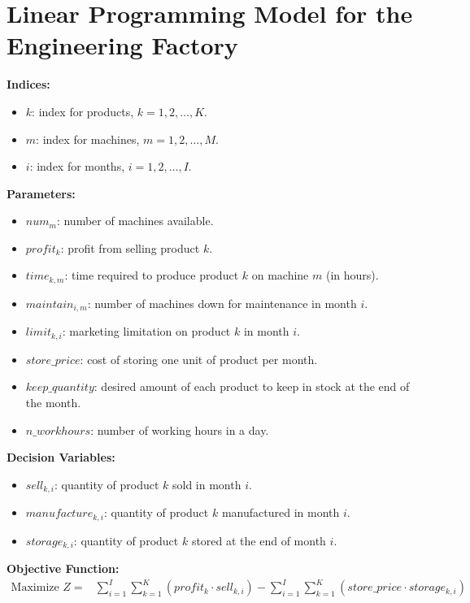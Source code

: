 \documentclass{article}
\begin{document}
\section*{Linear Programming Model for the Engineering Factory}

\textbf{Indices:}
\begin{itemize}
    \item $k$: index for products, $k = 1, 2, \ldots, K$.
    \item $m$: index for machines, $m = 1, 2, \ldots, M$.
    \item $i$: index for months, $i = 1, 2, \ldots, I$.
\end{itemize}

\textbf{Parameters:}
\begin{itemize}
    \item $num_m$: number of machines available.
    \item $profit_k$: profit from selling product $k$.
    \item $time_{k, m}$: time required to produce product $k$ on machine $m$ (in hours).
    \item $maintain_{i, m}$: number of machines down for maintenance in month $i$.
    \item $limit_{k, i}$: marketing limitation on product $k$ in month $i$.
    \item $store\_price$: cost of storing one unit of product per month.
    \item $keep\_quantity$: desired amount of each product to keep in stock at the end of the month.
    \item $n\_workhours$: number of working hours in a day.
\end{itemize}

\textbf{Decision Variables:}
\begin{itemize}
    \item $sell_{k,i}$: quantity of product $k$ sold in month $i$.
    \item $manufacture_{k,i}$: quantity of product $k$ manufactured in month $i$.
    \item $storage_{k,i}$: quantity of product $k$ stored at the end of month $i$.
\end{itemize}

\textbf{Objective Function:}
\begin{align*}
    \text{Maximize } Z = & \sum_{i=1}^{I} \sum_{k=1}^{K} (profit_k \cdot sell_{k, i}) - \sum_{i=1}^{I} \sum_{k=1}^{K} (store\_price \cdot storage_{k, i})
\end{align*}
\end{document}
